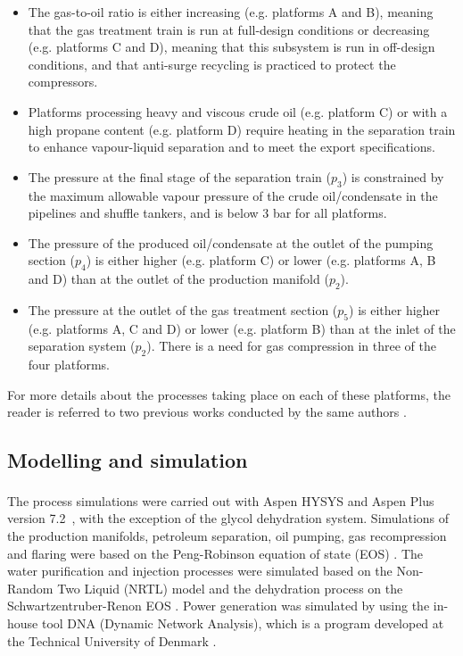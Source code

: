 \begin{itemize}
	\item The gas-to-oil ratio is either increasing (e.g. platforms A and B), meaning that the gas treatment train is run at full-design conditions or decreasing (e.g. platforms C and D), meaning that this subsystem is run in off-design conditions, and that anti-surge recycling is practiced to protect the compressors.
	\item Platforms processing heavy and viscous crude oil (e.g. platform C) or with a high propane content (e.g. platform D) require heating in the separation train to enhance vapour-liquid separation and to meet the export specifications.
	\item The pressure at the final stage of the separation train ($p_3$) is constrained by the maximum allowable vapour pressure of the crude oil/condensate in the pipelines and shuffle tankers, and is below 3 bar for all platforms.
	\item The pressure of the produced oil/condensate at the outlet of the pumping section ($p_4$) is either higher (e.g. platform C) or lower (e.g. platforms A, B and D) than at the outlet of the production manifold ($p_2$).
	\item The pressure at the outlet of the gas treatment section ($p_5$) is either higher (e.g. platforms A, C and D) or lower (e.g. platform B) than at the inlet of the separation system ($p_2$). There is a need for gas compression in three of the four platforms. 
\end{itemize} 

For more details about the processes taking place on each of these platforms, the reader is referred to two previous works conducted by the same authors \cite{Voldsund2013,Voldsund2013b}. 

\subsection{Modelling and simulation}

The process simulations were carried out with Aspen HYSYS\textsuperscript{\tiny\textregistered} \cite{Guide2004} and Aspen Plus\textsuperscript{\tiny\textregistered} version 7.2\ \cite{Technology1999}, with the exception of the glycol dehydration system. Simulations of the production manifolds, petroleum separation, oil pumping, gas recompression and flaring were based on the Peng-Robinson equation of state (EOS) \cite{Peng1976}. The water purification and injection processes were simulated based on the Non-Random Two Liquid (NRTL) model \cite{Renon1968} and the dehydration process on the Schwartzentruber-Renon EOS \cite{Schwartzentruber1989a,Schwartzentruber1989b}. Power generation was simulated by using the in-house tool DNA (Dynamic Network Analysis), which is a program developed at the Technical University of Denmark \cite{Elmegaard2005}. 

